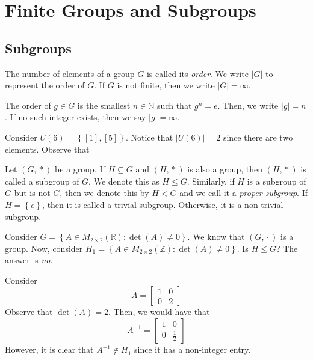\chapter{Finite Groups and Subgroups}

\section{Subgroups}

\begin{definition}
    The number of elements of a group \(G\) is called its \textit{order}. We write \(|G|\) to represent the order of \(G\). If \(G\) is not finite, then we write \(|G| = \infty\).
\end{definition}

\begin{definition}
    The order of \(g \in G\) is the smallest \(n \in \mathbb{N}\) such that \(g^n = e\). Then, we write \(|g| = n\). If no such integer exists, then we say \(|g| = \infty\).
\end{definition}

\begin{nexample}
    Consider \(U(6) = \left\{[1], [5]\right\}\). Notice that \(|U(6)| = 2\) since there are two elements. Observe that 
\end{nexample}

\begin{definition}[Subgroup]
    Let \((G, {}*{})\) be a group. If \(H \subseteq G\) and \((H, {}*{})\) is also a group, then \((H, {}*{})\) is called a subgroup of \(G\). We denote this as \(H \leq G\). Similarly, if \(H\) is a subgroup of \(G\) but is not \(G\), then we denote this by \(H < G\) and we call it a \textit{proper subgroup}. If \(H = \left\{e\right\}\), then it is called a trivial subgroup. Otherwise, it is a non-trivial subgroup.
\end{definition}

\begin{nexample}
    Consider \(G = \left\{A \in M_{2 \times 2}(\mathbb{R}) : \det(A) \neq 0\right\}\). We know that \((G, {}\cdot{})\) is a group. Now, consider \(H_1 = \left\{A \in M_{2 \times 2}(\mathbb{Z}) : \det(A) \neq 0\right\}\). Is \(H \leq G\)? The answer is \textit{no}.

    Consider
    \[
        A = \begin{bmatrix}
            1 & 0 \\
            0 & 2
        \end{bmatrix}
    \]
    Observe that \(\det(A) = 2\). Then, we would have that
    \[
        A^{-1} = \begin{bmatrix}
            1 & 0 \\
            0 & \frac{1}{2}
        \end{bmatrix}
    \]
    However, it is clear that \(A^{-1} \notin H_1\) since it has a non-integer entry.
\end{nexample}

